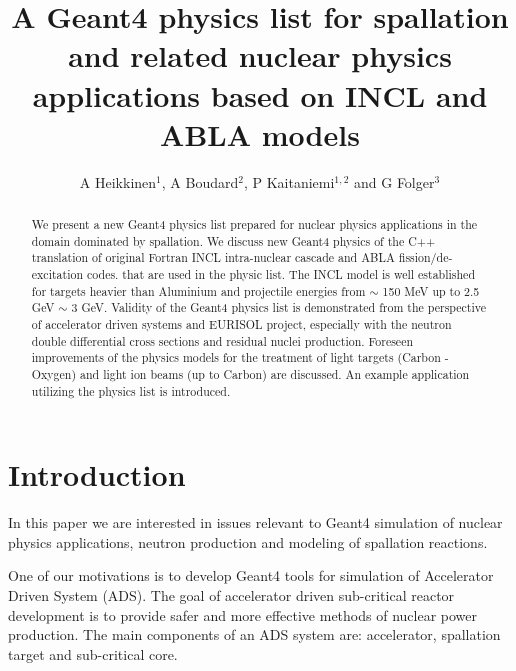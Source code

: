 \documentclass[a4paper]{jpconf}
\begin{document}
\title{A Geant4 physics list for spallation and related nuclear physics applications 
based on INCL and ABLA models}

\author{A Heikkinen$^1$, A Boudard$^2$, P Kaitaniemi$^{1,2}$ and G Folger$^3$}


\address{$^1$ Helsinki Institute of Physics, P.O. Box 64, FIN-00014 University of Helsinki, Finland}
\address{$^2$ CEN-Saclay, CEA-IRFU/SPhN, 91 191 Gif sur Yvette, France}
\address{$^3$ European Organization for Nuclear Research (CERN), Switzerland}


\begin{abstract}
We present a new Geant4 physics list prepared for nuclear physics applications
in the domain dominated by spallation.
We discuss new Geant4 physics of the C++ translation of original Fortran 
INCL intra-nuclear cascade and ABLA fission/de-excitation codes.
that are used in the physic list.
The INCL model is well established for targets heavier than Aluminium
and projectile energies from $\sim$ 150 MeV up to 2.5 GeV $\sim$ 3 GeV.
Validity of the Geant4 physics list is demonstrated from the perspective of accelerator driven systems
and EURISOL project, especially with the neutron double differential cross sections and residual
nuclei production.
Foreseen improvements of the physics models for the treatment of light targets (Carbon - Oxygen)
and light ion beams (up to Carbon) are discussed.
An example application utilizing the physics list is introduced.
\end{abstract}

\section{Introduction} \label{sec:intro}
In this paper we are interested in issues relevant to Geant4 simulation of nuclear physics applications,
neutron production and modeling of spallation reactions.  


One of our motivations is to  develop Geant4 tools
 for simulation of Accelerator Driven System (ADS).
The goal of accelerator driven sub-critical reactor 
development is to provide safer and more effective
methods of nuclear power production. 
The main components of an ADS system are: accelerator, spallation
target and sub-critical core.
\end{document}
